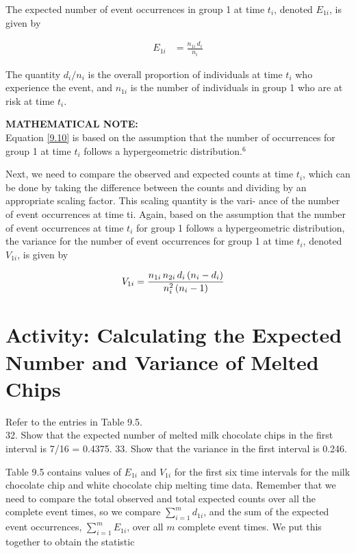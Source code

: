 \documentclass[
]{report}
\begin{document}
The expected number of event occurrences in group 1 at time \(t_i\), denoted \(E_{1i}\), is given by

\begin{align}\label{9.10}
E_{1i} &= \frac{n_{1i}\,d_i}{n_i}
\tag{9.10}
\end{align}

The quantity \(d_i/n_i\) is the overall proportion of individuals at time \(t_i\) who experience the event, and \(n_{1i}\) is the
number of individuals in group 1 who are at risk at time \(t_i\).

\large

\textbf{MATHEMATICAL NOTE:}\\
Equation \ref{9.10} is based on the assumption that the number of occurrences for group 1 at time \(t_i\) follows a hypergeometric distribution.\(^6\)
\normalsize

Next, we need to compare the observed and expected counts at time \(t_i\), which can be done by taking the
difference between the counts and dividing by an appropriate scaling factor. This scaling quantity is the vari-
ance of the number of event occurrences at time ti. Again, based on the assumption that the number of event
occurrences at time \(t_i\) for group 1 follows a hypergeometric distribution, the variance for the number of event
occurrences for group 1 at time \(t_i\), denoted \(V_{1i}\), is given by

\begin{align}
V_{1i} &= \frac{n_{1i}\,n_{2i}\,d_i\,(n_i - d_i)}{n_i^2\,(n_i - 1)}
\notag
\end{align}

\section*{Activity: Calculating the Expected Number and Variance of Melted Chips}\label{activity-calculating-the-expected-number-and-variance-of-melted-chips}

Refer to the entries in Table 9.5.\\
32. Show that the expected number of melted milk chocolate chips in the first interval is 7/16 = 0.4375.
33. Show that the variance in the first interval is 0.246.

Table 9.5 contains values of \(E_{1i}\) and \(V_{1i}\) for the first six time intervals for the milk chocolate chip and white chocolate chip melting time data. Remember that we need to compare the total observed and total expected counts over all the complete event times, so we compare \(\sum_{i=1}^m d_{1i}\), and the sum of the expected event occurrences, \(\sum_{i=1}^m E_{1i}\), over all \(m\) complete event times. We put this together to obtain the statistic
\end{document}

